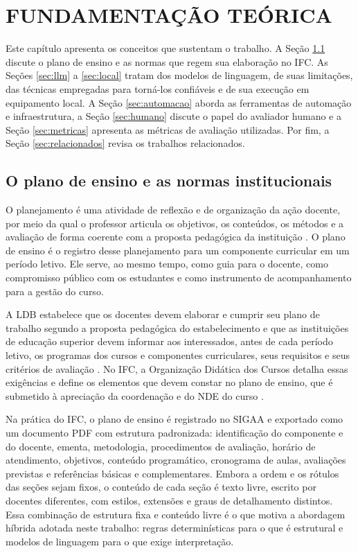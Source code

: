 \chapter{FUNDAMENTAÇÃO TEÓRICA}
\label{cap:fundamentacao}

Este capítulo apresenta os conceitos que sustentam o trabalho. A Seção \ref{sec:plano} discute o plano de ensino e as normas que regem sua elaboração no IFC. As Seções \ref{sec:llm} a \ref{sec:local} tratam dos modelos de linguagem, de suas limitações, das técnicas empregadas para torná-los confiáveis e de sua execução em equipamento local. A Seção \ref{sec:automacao} aborda as ferramentas de automação e infraestrutura, a Seção \ref{sec:humano} discute o papel do avaliador humano e a Seção \ref{sec:metricas} apresenta as métricas de avaliação utilizadas. Por fim, a Seção \ref{sec:relacionados} revisa os trabalhos relacionados.

\section{O plano de ensino e as normas institucionais}
\label{sec:plano}

O planejamento é uma atividade de reflexão e de organização da ação docente, por meio da qual o professor articula os objetivos, os conteúdos, os métodos e a avaliação de forma coerente com a proposta pedagógica da instituição \cite{Libaneo1994}. O plano de ensino é o registro desse planejamento para um componente curricular em um período letivo. Ele serve, ao mesmo tempo, como guia para o docente, como compromisso público com os estudantes e como instrumento de acompanhamento para a gestão do curso.

A LDB estabelece que os docentes devem elaborar e cumprir seu plano de trabalho segundo a proposta pedagógica do estabelecimento e que as instituições de educação superior devem informar aos interessados, antes de cada período letivo, os programas dos cursos e componentes curriculares, seus requisitos e seus critérios de avaliação \cite{Brasil1996}. No IFC, a Organização Didática dos Cursos detalha essas exigências e define os elementos que devem constar no plano de ensino, que é submetido à apreciação da coordenação e do NDE do curso \cite{ifc2022}.

Na prática do IFC, o plano de ensino é registrado no SIGAA e exportado como um documento PDF com estrutura padronizada: identificação do componente e do docente, ementa, metodologia, procedimentos de avaliação, horário de atendimento, objetivos, conteúdo programático, cronograma de aulas, avaliações previstas e referências básicas e complementares. Embora a ordem e os rótulos das seções sejam fixos, o conteúdo de cada seção é texto livre, escrito por docentes diferentes, com estilos, extensões e graus de detalhamento distintos. Essa combinação de estrutura fixa e conteúdo livre é o que motiva a abordagem híbrida adotada neste trabalho: regras determinísticas para o que é estrutural e modelos de linguagem para o que exige interpretação.

